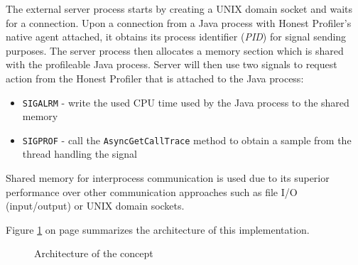 \documentclass[..thesis.tex]{subfiles}
\begin{document}
The external server process starts by creating a UNIX domain socket and waits for a connection. Upon a connection from a Java process with Honest Profiler's native agent attached, it obtains its process identifier (\textit{PID}) for signal sending purposes. The server process then allocates a memory section which is shared with the profileable Java process. Server will then use two signals to request action from the Honest Profiler that is attached to the Java process:

\begin{itemize}
	\item \texttt{SIGALRM} - write the used CPU time used by the Java process to the shared memory
	\item \texttt{SIGPROF} - call the \texttt{Async\-Get\-Call\-Trace} method to obtain a sample from the thread handling the signal
\end{itemize}

Shared memory for interprocess communication is used due to its superior performance over other communication approaches such as file I/O (input/output) or UNIX domain sockets. 

Figure \ref{fig:shared_mem_arctitecture} on page \pageref{fig:shared_mem_arctitecture} summarizes the architecture of this implementation.
\begin{figure}[h]
\centering
{}
\caption{Architecture of the concept}
\label{fig:shared_mem_arctitecture}
\end{figure}
\end{document}
